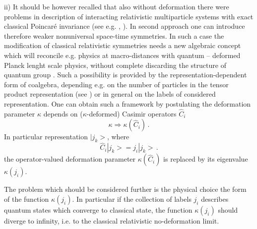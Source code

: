 \documentclass[a4paper,a4paper]{article}
\begin{document}
ii) It should be however recalled that also without deformation
there were problems in description of interacting relativistic
multiparticle systems with exact classical Poincar\'{e} invariance
(see e.g. \cite{cjs}, \cite{hl}). In second approach one can
introduce therefore weaker nonuniversal space-time symmetries. In
such a case the modification of classical relativistic symmetries
needs a new algebraic concept which will reconcile e.g. physics at
macro-distances  with quantum -- deformed Planck lenght scale
physics, without complete discarding the structure of quantum
group \cite{smaj}. Such a possibility is provided by the
representation-dependent form of coalgebra,  depending e.g. on the
number of particles in the tensor product representation (see
\cite{ms2}) or in general on the labels of considered
representation. One can obtain such a framework by postulating the
deformation parameter $\kappa$ depends on ($\kappa$-deformed)
Casimir operators $\hat{C}_i$
\begin{equation}\label{lupra4.1}
\kappa\Longrightarrow \kappa(\hat{C}_i)\, .
\end{equation}
In particular representation $|{j_k}>$, where
\begin{equation}\label{lupra4.2}
\hat{C}_i|{j_k}> = j_i |{j_k}>\, .
\end{equation}
the operator-valued deformation parameter $\kappa(\hat{C}_i)$ is
replaced by its eigenvalue $\kappa(j_i)$.

The problem which should be considered further is the physical
choice the form of the function $\kappa(j_i)$. In particular if
the collection of labels ${j_i}$ describes quantum states which
converge to classical state, the function $\kappa(j_i)$ should
diverge to infinity, i.e. to the classical relativistic
no-deformation limit.
\end{document}
